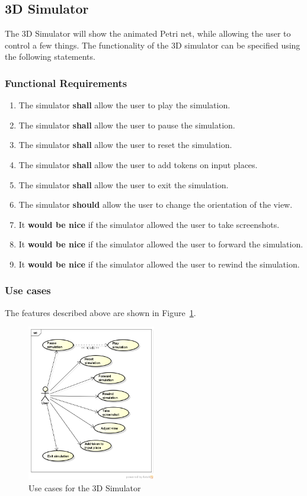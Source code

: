 \subsection{3D Simulator}
\label{sec:sf-simulator}
The 3D Simulator will show the animated Petri net, while allowing the user to control a few things. The functionality of the 3D simulator can be specified using the following statements.
\subsubsection{Functional Requirements}
\begin{enumerate}
\item The simulator \textbf{shall} allow the user to play the simulation.
\item The simulator \textbf{shall} allow the user to pause the simulation.
\item The simulator \textbf{shall} allow the user to reset the simulation.
\item The simulator \textbf{shall} allow the user to add tokens on input places.
\item The simulator \textbf{shall} allow the user to exit the simulation.
\item The simulator \textbf{should} allow the user to change the orientation of the view.
\item It \textbf{would be nice} if the simulator allowed the user to take screenshots.
\item It \textbf{would be nice} if the simulator allowed the user to forward the simulation.
\item It \textbf{would be nice} if the simulator allowed the user to rewind the simulation.
\end{enumerate}

\subsubsection{Use cases}

The features described above are shown in Figure~\ref{fig:use-cases-simulator}.

\begin{figure}[htp]
\begin{center}
  \includegraphics[width=0.5\textwidth]{image/uc-simulator.png}
  \caption{Use cases for the 3D Simulator}
  \label{fig:use-cases-simulator}
\end{center}
\end{figure}